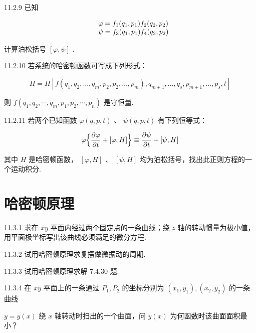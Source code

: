 \begin{problem}{11.2.9}
已知

\[
\begin{array}{r l} & \varphi = f _ {1} (q _ {1}, p _ {1}) f _ {2} (q _ {2}, p _ {2}) \\ & \psi = f _ {3} (q _ {1}, p _ {1}) f _ {4} (q _ {2}, p _ {2}) \end{array}
\]

计算泊松括号 $[\varphi,\psi]$ .
\end{problem}
\clearpage


\begin{problem}{11.2.10}
若系统的哈密顿函数可写成下列形式：

\[
H = H \left[ f \left(q _ {1}, q _ {2}, \dots , q _ {m}, p _ {2}, p _ {2}, \dots , p _ {m}\right), q _ {m + 1}, \dots , q _ {s}, p _ {m + 1}, \dots , p _ {s}, t \right]
\]

则 $f(q_{1},q_{2},\cdots,q_{m},p_{1},p_{2},\cdots,p_{n})$ 是守恒量.
\end{problem}
\clearpage


\begin{problem}{11.2.11}
若两个已知函数 $\varphi(q, p, t)$ 、 $\psi(q, p, t)$ 有下列恒等式：

\[
\varphi \Bigl \{\frac {\partial \varphi}{\partial t} + [ \varphi , H ] \Bigr \} \equiv \frac {\partial \psi}{\partial t} + [ \psi , H ]
\]

其中 $H$ 是哈密顿函数， $[\varphi, H]$ 、 $[\psi, H]$ 均为泊松括号，找出此正则方程的一个运动积分.
\end{problem}
\clearpage


\section{哈密顿原理}

\begin{problem}{11.3.1}
求在 $xy$ 平面内经过两个固定点的一条曲线；绕 $z$ 轴的转动惯量为极小值，用平面极坐标写出该曲线必须满足的微分方程.
\end{problem}
\clearpage


\begin{problem}{11.3.2}
试用哈密顿原理求复摆做微振动的周期.
\end{problem}
\clearpage


\begin{problem}{11.3.3}
试用哈密顿原理求解 7.4.30 题.
\end{problem}
\clearpage


\begin{problem}{11.3.4}
在 $xy$ 平面上的一条通过 $P_{1}, P_{2}$ 的坐标分别为 $(x_{1}, y_{1}), (x_{2}, y_{2})$ 的一条曲线

$y = y(x)$ 绕 $x$ 轴转动时扫出的一个曲面，问 $y(x)$ 为何函数时该曲面面积最小？
\end{problem}
\clearpage


